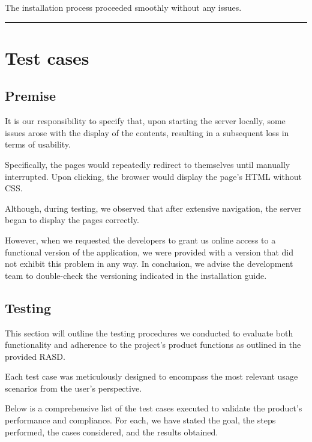 \documentclass{Configuration_Files/Template}
\begin{document}
The installation process proceeded smoothly without any issues.

{\color{bluepoli}\rule{\linewidth}{0.1pt}}

\chapter{Test cases}

\section{Premise}

It is our responsibility to specify that, upon starting the server locally, some issues arose with the display of the contents, resulting in a subsequent loss in terms of usability.

Specifically, the pages would repeatedly redirect to themselves until manually interrupted. Upon clicking, the browser would display the page's HTML without CSS.

Although, during testing, we observed that after extensive navigation, the server began to display the pages correctly.

However, when we requested the developers to grant us online access to a functional version of the application, we were provided with a version that did not exhibit this problem in any way. In conclusion, we advise the development team to double-check the versioning indicated in the installation guide.

\section{Testing}

This section will outline the testing procedures we conducted to evaluate both functionality and adherence to the project's product functions as outlined in the provided RASD.

Each test case was meticulously designed to encompass the most relevant usage scenarios from the user's perspective.

Below is a comprehensive list of the test cases executed to validate the product's performance and compliance. For each, we have stated the goal, the steps performed, the cases considered, and the results obtained.\\
\end{document}
